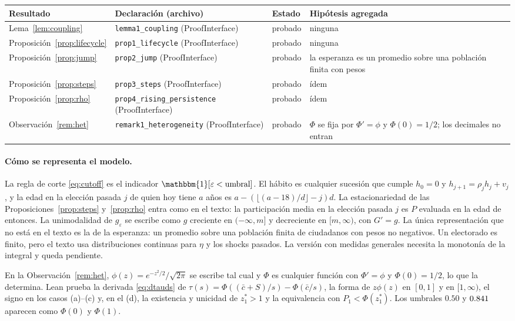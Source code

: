 \documentclass[11pt]{article}
\theoremstyle{definition}
\newcommand{\1}{\mathbbm{1}}
\begin{document}
\begin{center}\small
\begin{tabular}{p{2.6cm}p{5.0cm}p{1.9cm}p{5.2cm}}
\toprule
Resultado & Declaración (archivo) & Estado & Hipótesis agregada \\
\midrule
Lema~\ref{lem:coupling} & \texttt{lemma1\_coupling} (ProofInterface) & probado & ninguna \\
Proposición~\ref{prop:lifecycle} & \texttt{prop1\_lifecycle} (ProofInterface) & probado & ninguna \\
Proposición~\ref{prop:jump} & \texttt{prop2\_jump} (ProofInterface) & probado & la esperanza es un promedio sobre
una población finita con pesos \\
Proposición~\ref{prop:steps} & \texttt{prop3\_steps} (ProofInterface) & probado & ídem \\
Proposición~\ref{prop:rho} & \texttt{prop4\_rising\_persistence} (ProofInterface) & probado & ídem \\
Observación~\ref{rem:het} & \texttt{remark1\_heterogeneity} (ProofInterface) & probado & $\Phi$ se
fija por $\Phi'=\phi$ y $\Phi(0)=1/2$; los decimales no entran \\
\bottomrule
\end{tabular}
\end{center}

\paragraph{Cómo se representa el modelo.} La regla de corte \eqref{eq:cutoff} es el indicador
$\1[\varepsilon<\text{umbral}]$. El hábito es cualquier sucesión que cumple $h_0=0$ y
$h_{j+1}=\rho_j h_j+v_j$, y la edad en la elección pasada $j$ de quien hoy tiene $a$ años es
$a-(\lfloor(a-18)/d\rfloor-j)d$. La estacionariedad de las Proposiciones~\ref{prop:steps}
y~\ref{prop:rho} entra como en el texto: la participación media en la elección pasada $j$ es $P$
evaluada en la edad de entonces. La unimodalidad de $g_\varepsilon$ se escribe como $g$ creciente en
$(-\infty,m]$ y decreciente en $[m,\infty)$, con $G'=g$. La única representación que no está en el
texto es la de la esperanza: un promedio sobre una población finita de ciudadanos con pesos no
negativos. Un electorado es finito, pero el texto usa distribuciones continuas para $\eta$ y los
shocks pasados. La versión con medidas generales necesita la monotonía de la integral y queda
pendiente.

En la Observación~\ref{rem:het}, $\phi(z)=e^{-z^2/2}/\sqrt{2\pi}$ se escribe tal cual y $\Phi$ es
cualquier función con $\Phi'=\phi$ y $\Phi(0)=1/2$, lo que la determina. Lean prueba la derivada
\eqref{eq:dtauds} de $\tau(s)=\Phi((\bar c+S)/s)-\Phi(\bar c/s)$, la forma de $z\phi(z)$ en $[0,1]$ y
en $[1,\infty)$, el signo en los casos (a)--(c) y, en el (d), la existencia y unicidad de $z_1^*>1$ y
la equivalencia con $P_1<\Phi(z_1^*)$. Los umbrales $0.50$ y $0.841$ aparecen como $\Phi(0)$ y
$\Phi(1)$.
\end{document}
